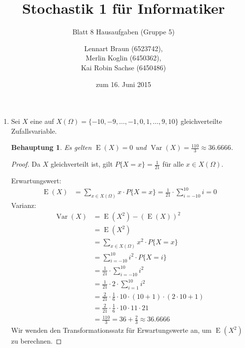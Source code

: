 \documentclass[a4paper]{scrartcl}
\title{Stochastik 1 für Informatiker}
\subtitle{Blatt 8 Hausaufgaben (Gruppe 5)}
\author{
    Lennart Braun (6523742), \\
    Merlin Koglin (6450362), \\
    Kai Robin Sachse (6450486)
}
\date{zum 16. Juni 2015}
\newtheorem*{behaupt}{Behauptung}
\newcommand{\e}{\operatorname{E}}
\newcommand{\var}{\operatorname{Var}}
\begin{document}
\maketitle

\begin{enumerate}[label=\bfseries\arabic*.]
    \item
        Sei $X$ eine auf
        $X(\Omega) = \{-10, -9, \ldots, -1, 0, 1, \ldots, 9, 10\}$
        gleichverteilte Zufallsvariable.
        \begin{behaupt}
            Es gelten $\e(X) = 0$ und
            $\var(X) = \frac{110}{3} \approx \num{36,6666}$.
        \end{behaupt}
        \begin{proof}
            Da $X$ gleichverteilt ist, gilt $P\{X = x\} = \frac{1}{21}$ für alle
            $x \in X(\Omega)$.

            Erwartungswert:
            \begin{equation*}
                \begin{split}
                    \e(X) &= \sum_{x \in X(\Omega)} x \cdot P\{X = x\} 
                          = \frac{1}{21} \cdot \sum_{i=-10}^{10} i 
                          = 0
                \end{split}
            \end{equation*}
            Varianz:
            \begin{equation*}
                \begin{split}
                    \var(X) &= \e(X^2) - (\e(X))^2 \\
                            &= \e(X^2) \\
                            &= \sum_{x \in X(\Omega)} x^2 \cdot P\{X = x\}  \\
                            &= \sum_{i=-10}^{10} i^2 \cdot P\{X = i\} \\
                            &= \frac{1}{21} \cdot \sum_{i=-10}^{10} i^2 \\
                            &= \frac{1}{21} \cdot 2 \cdot \sum_{i=1}^{10} i^2 \\
                            &= \frac{2}{21} \cdot \frac{1}{6} \cdot 10 \cdot
                               (10 + 1) \cdot (2 \cdot 10 + 1) \\
                            &= \frac{2}{21} \cdot \frac{1}{6} \cdot 10 \cdot 11
                               \cdot 21 \\
                            &= \frac{110}{3} = 36 + \frac{2}{3}
                               \approx \num{36,6666}
                \end{split}
            \end{equation*}
            Wir wenden den Transformationssatz für Erwartungswerte an, um
            $\e(X^2)$ zu berechnen.
        \end{proof}


\end{enumerate}
\end{document}

